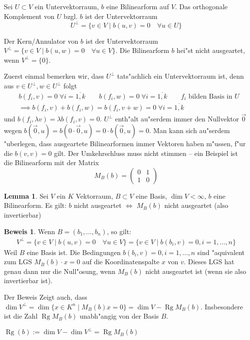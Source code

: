 \documentclass[oneside,fontsize=11pt,paper=a4,BCOR=0mm,DIV=12,automark,headsepline]{scrbook}
\DeclareMathOperator{\mRg}{Rg}
\theoremstyle{remark}
\theoremstyle{definition}
\newtheorem{lemma}{Lemma}[section]
\theoremstyle{definition}
\newtheorem*{prof}{Beweis}
\theoremstyle{remark}
\begin{document}
\begin{definition}{}{}
  Sei $U\subset V$ ein Untervektorraum, $b$ eine Bilinearform auf $V$. Das
  orthogonale Komplement von $U$ bzgl. $b$ ist der Untervektorraum \[U^\perp = \{v\in V\mid b(u, v) = 0\quad \forall u \in U\}\]

  Der Kern/Annulator von $b$ ist der Untervektorraum $V^\perp = \{v\in V \mid b(u, w) = 0 \quad \forall u\in V\}$. Die Bilinearform $b$ hei"st nicht ausgeartet, wenn \(V^\perp = \{0\}\).
\end{definition}
\begin{comm}
  Zuerst einmal bemerken wir, dass \(U^\perp\) tats"achlich ein Untervektorraum ist, denn aus \(v\in U^\perp, w\in U^\perp\) folgt
  \begin{align*}
    &b(f_i, v) = 0\;\forall i=\overline{1,k}\qquad b(f_i, w) = 0\;\forall i=\overline{1,k}\qquad f_i\text{ bilden Basis in }U \\
    &\implies b(f_i, v) + b(f_i, w) = b(f_i, v+ w) = 0\;\forall i=\overline{1, k}
  \end{align*}
  und \(b(f_i, \lambda v) = \lambda b(f_i, v) = 0\). \(U^\perp\) enth"alt au"serdem immer den Nullvektor \(\vec{0}\) wegen \(b(\vec{0}, u) = b(0\cdot \vec{0}, u) = 0\cdot b(\vec{0}, u) = 0\). Man kann sich au"serdem "uberlegen, dass ausgeartete Bilinearformen immer Vektoren haben m"ussen, f"ur die \(b(v, v) = 0\) gilt. Der Umkehrschluss muss nicht stimmen -- ein Beispiel ist die Bilinearform mit der Matrix \[M_B(b) = \begin{pmatrix}0 & 1\\ 1& 0\end{pmatrix}\]
\end{comm}
\begin{lemma}
  Sei $V$ ein $K$ Vektorraum, $B\subset V$ eine Basis, $\dim V < \infty$, $b$
  eine Bilinearform. Es gilt: $b$ nicht ausgeartet $\iff$ $M_B(b)$ nicht
  ausgeartet (also invertierbar)
\end{lemma}

\begin{prof}
  Wenn \(B = (b_1, \dots, b_n)\), so gilt:
  \begin{align*}
    V^\perp = \{v \in V \mid b(u, v) = 0\quad \forall u \in V\} = \{ v\in V \mid b(b_i, v) = 0, i = 1,\dots, n\}
  \end{align*}
  Weil \(B\) eine Basis ist.
  Die Bedingungen \(b(b_i, v) = 0, i = 1,\dots, n\) sind "aquivalent zum LGS $M_B(b) \cdot x = 0 $  auf die
  Koordinatenspalte $x$ von $v$. Dieses LGS hat genau dann nur die Null"osung,
  wenn $M_B(b)$ nicht ausgeartet ist (wenn sie also invertierbar ist).
\end{prof}
Der Beweis Zeigt auch, dass $\dim V^\perp = \dim
\{x\in K^n\mid  M_B(b)x= 0\} = \dim V - \mRg M_B(b)$. Insbesondere ist die Zahl $\mRg M_B(b)$
unabh"angig von der Basis $B$.
\begin{definition}{}{}
  \(\mRg(b):=\dim V - \dim V^\perp = \mRg M_B(b)\)
\end{definition}
\end{document}
